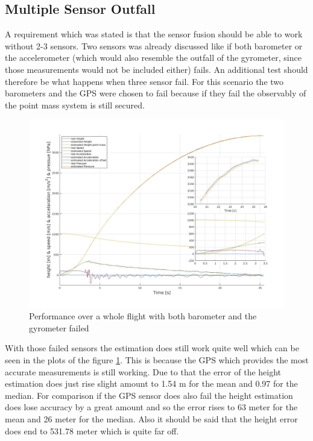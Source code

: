 \newpage
\subsection{Multiple Sensor Outfall}
A requirement which was stated is that the sensor fusion should be able to work without 2-3 sensors.
Two sensors was already discussed like if both barometer or the accelerometer 
(which would also resemble the outfall of the gyrometer, since those measurements would not be included either) fails.
An additional test should therefore be what happens when three sensor fail.
For this scenario the two barometers and the GPS were chosen to fail because if they fail the observably of the point mass system is still secured.

\begin{figure}[h!]
 \centering
 \includegraphics[width=.8\textwidth]{./Pictures/BestSystemPerformanceAccOutfall.jpg}
 \caption{Performance over a whole flight with both barometer and the gyrometer failed}
 \label{fig:PerformanceMOutfall}
\end{figure}

With those failed sensors the estimation does still work quite well which can be seen in the plots of the figure \ref{fig:PerformanceMOutfall}.
This is because the GPS which provides the most accurate measurements is still working.
Due to that the error of the height estimation does just rise slight amount to 1.54 m for the mean and 0.97 for the median.
For comparison if the GPS sensor does also fail the height estimation does lose accuracy by a great amount and so the error rises to 63 meter for the mean and 26 meter for the median.
Also it should be said that the height error does end to 531.78 meter which is quite far off.